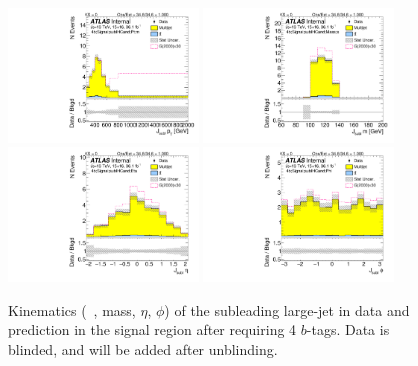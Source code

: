 \begin{figure}[htbp!]
\begin{center}
\includegraphics[width=0.45\textwidth,angle=-90]{figures/boosted/Signal/b77_FourTag_Signal_sublHCand_Pt_m_blind.pdf}
\includegraphics[width=0.45\textwidth,angle=-90]{figures/boosted/Signal/b77_FourTag_Signal_sublHCand_Mass_s_blind.pdf}\\
\includegraphics[width=0.45\textwidth,angle=-90]{figures/boosted/Signal/b77_FourTag_Signal_sublHCand_Eta_blind.pdf}
\includegraphics[width=0.45\textwidth,angle=-90]{figures/boosted/Signal/b77_FourTag_Signal_sublHCand_Phi_blind.pdf}
  \caption{Kinematics (\pt~, mass, $\eta$, $\phi$) of the subleading large-\R jet in data and prediction in the signal region after requiring 4 $b$-tags. Data is blinded, and will be added after unblinding.}
  \label{fig:boosted-4b-signal-blind-ak10-subl}
\end{center}
\end{figure}

